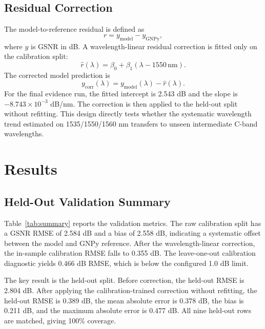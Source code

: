 \documentclass[conference]{IEEEtran}
\begin{document}
\subsection{Residual Correction}
The model-to-reference residual is defined as
\begin{equation}
    r = y_{\mathrm{model}} - y_{\mathrm{GNPy}},
\end{equation}
where $y$ is GSNR in dB. A wavelength-linear residual correction is fitted only on the calibration split:
\begin{equation}
    \hat{r}(\lambda) = \beta_0 + \beta_1(\lambda-1550\,\mathrm{nm}).
\end{equation}
The corrected model prediction is
\begin{equation}
    y_{\mathrm{corr}}(\lambda) = y_{\mathrm{model}}(\lambda) - \hat{r}(\lambda).
\end{equation}
For the final evidence run, the fitted intercept is 2.543 dB and the slope is $-8.743\times10^{-3}$ dB/nm. The correction is then applied to the held-out split without refitting. This design directly tests whether the systematic wavelength trend estimated on 1535/1550/1560 nm transfers to unseen intermediate C-band wavelengths.

\section{Results}
\subsection{Held-Out Validation Summary}
Table~\ref{tab:summary} reports the validation metrics. The raw calibration split has a GSNR RMSE of 2.584 dB and a bias of 2.558 dB, indicating a systematic offset between the model and GNPy reference. After the wavelength-linear correction, the in-sample calibration RMSE falls to 0.355 dB. The leave-one-out calibration diagnostic yields 0.466 dB RMSE, which is below the configured 1.0 dB limit.

The key result is the held-out split. Before correction, the held-out RMSE is 2.804 dB. After applying the calibration-trained correction without refitting, the held-out RMSE is 0.389 dB, the mean absolute error is 0.378 dB, the bias is 0.211 dB, and the maximum absolute error is 0.477 dB. All nine held-out rows are matched, giving 100\% coverage.
\end{document}
